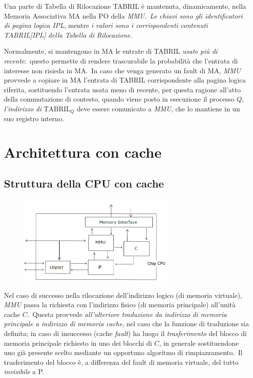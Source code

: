 Una parte di Tabella di Rilocazione TABRIL è mantenuta, dinamicamente, nella Memoria Associativa MA nella PO della \textit{MMU}.\
\textit{Le chiavi sono gli identificatori di pagina logica IPL}, mentre \textit{i valori sono i corrispondenti contenuti TABRIL[IPL] della Tabella di Rilocazione}.

Normalmente, si mantengono in MA le entrate di TABRIL \textit{usate più di recente}:\ questo permette di rendere trascurabile la probabilità che l'entrata di interesse non risieda in MA.\
In caso che venga generato un fault di MA, \textit{MMU} provvede a copiare in MA l'entrata di TABRIL corrispondente alla pagina logica riferita, sostituendo l'entrata usata meno di recente, per questa ragione all'atto della commutazione di contesto, quando viene posto in esecuzione il processo $Q$, \textit{l'indirizzo di} $\mathrm{TABRIL}_Q$ deve essere comunicato a \textit{MMU}, che lo mantiene in un suo registro interno.

\section{Architettura con cache}

\subsection{Struttura della CPU con cache}

\begin{figure}[H]
    \centering
    \includegraphics[width=0.7\textwidth]{immagini/CPU_cache.png}
\end{figure}

\noindent Nel caso di successo nella rilocazione dell'indirizzo logico (di memoria virtuale), \textit{MMU} passa la richiesta con l'indirizzo fisico (di memoria principale) all'unità cache $C$.\
Questa provvede \textit{all'ulteriore traduzione da indirizzo di memoria principale a indirizzo di memoria cache}, nel caso che la funzione di traduzione sia definita; in caso di insuccesso (cache \textit{fault}) ha luogo il \textit{trasferimento} del blocco di memoria principale richiesto in uno dei blocchi di $C$, in generale sostituendone uno già presente scelto mediante un opportuno algoritmo di rimpiazzamento.\
Il trasferimento del blocco è, a differenza del fault di memoria virtuale, del tutto \textit{invisibile} a P.

